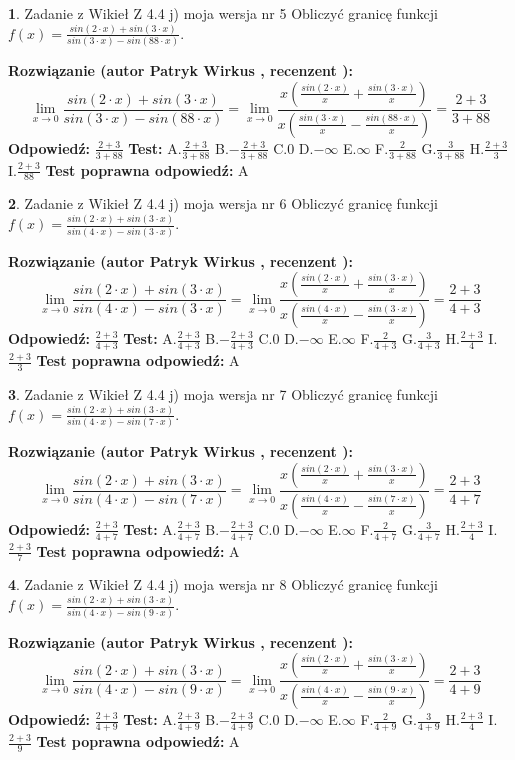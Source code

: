 \documentclass[12pt, a4paper]{article}
\theoremstyle{definition} %
\newtheorem{zad}{}
\newcommand{\zadStart}[1]{\begin{zad}#1\newline}
\newcommand{\zadStop}{\end{zad}}
\newcommand{\rozwStart}[2]{\noindent \textbf{Rozwiązanie (autor #1 , recenzent #2): }\newline}
\newcommand{\rozwStop}{\newline}
\newcommand{\odpStart}{\noindent \textbf{Odpowiedź:}\newline}
\newcommand{\odpStop}{\newline}
\newcommand{\testStart}{\noindent \textbf{Test:}\newline}
\newcommand{\testStop}{\newline}
\newcommand{\kluczStart}{\noindent \textbf{Test poprawna odpowiedź:}\newline}
\newcommand{\kluczStop}{\newline}
\begin{document}
\zadStart{Zadanie z Wikieł Z 4.4 j) moja wersja nr 5}
Obliczyć granicę funkcji $f(x)=\frac{sin(2\cdot x) +sin(3\cdot x)}{sin(3\cdot x) -sin(88\cdot x)}$.
\zadStop
\rozwStart{Patryk Wirkus}{}
$$\lim\limits_{x\to 0}\frac{sin(2\cdot x) +sin(3\cdot x)}{sin(3\cdot x) -sin(88\cdot x)}=\lim\limits_{x\to 0}\frac{x(\frac{sin(2\cdot x)}{x}+\frac{sin(3\cdot x)}{x})}{x(\frac{sin(3\cdot x)}{x}-\frac{sin(88\cdot x)}{x})}=\frac{2+3}{3+88}$$
\rozwStop
\odpStart
$\frac{2+3}{3+88}$
\odpStop
\testStart
A.$\frac{2+3}{3+88}$
B.$-\frac{2+3}{3+88}$
C.$0$
D.$-\infty$
E.$\infty$
F.$\frac{2}{3+88}$
G.$\frac{3}{3+88}$
H.$\frac{2+3}{3}$
I.$\frac{2+3}{88}$
\testStop
\kluczStart
A
\kluczStop



\zadStart{Zadanie z Wikieł Z 4.4 j) moja wersja nr 6}
Obliczyć granicę funkcji $f(x)=\frac{sin(2\cdot x) +sin(3\cdot x)}{sin(4\cdot x) -sin(3\cdot x)}$.
\zadStop
\rozwStart{Patryk Wirkus}{}
$$\lim\limits_{x\to 0}\frac{sin(2\cdot x) +sin(3\cdot x)}{sin(4\cdot x) -sin(3\cdot x)}=\lim\limits_{x\to 0}\frac{x(\frac{sin(2\cdot x)}{x}+\frac{sin(3\cdot x)}{x})}{x(\frac{sin(4\cdot x)}{x}-\frac{sin(3\cdot x)}{x})}=\frac{2+3}{4+3}$$
\rozwStop
\odpStart
$\frac{2+3}{4+3}$
\odpStop
\testStart
A.$\frac{2+3}{4+3}$
B.$-\frac{2+3}{4+3}$
C.$0$
D.$-\infty$
E.$\infty$
F.$\frac{2}{4+3}$
G.$\frac{3}{4+3}$
H.$\frac{2+3}{4}$
I.$\frac{2+3}{3}$
\testStop
\kluczStart
A
\kluczStop



\zadStart{Zadanie z Wikieł Z 4.4 j) moja wersja nr 7}
Obliczyć granicę funkcji $f(x)=\frac{sin(2\cdot x) +sin(3\cdot x)}{sin(4\cdot x) -sin(7\cdot x)}$.
\zadStop
\rozwStart{Patryk Wirkus}{}
$$\lim\limits_{x\to 0}\frac{sin(2\cdot x) +sin(3\cdot x)}{sin(4\cdot x) -sin(7\cdot x)}=\lim\limits_{x\to 0}\frac{x(\frac{sin(2\cdot x)}{x}+\frac{sin(3\cdot x)}{x})}{x(\frac{sin(4\cdot x)}{x}-\frac{sin(7\cdot x)}{x})}=\frac{2+3}{4+7}$$
\rozwStop
\odpStart
$\frac{2+3}{4+7}$
\odpStop
\testStart
A.$\frac{2+3}{4+7}$
B.$-\frac{2+3}{4+7}$
C.$0$
D.$-\infty$
E.$\infty$
F.$\frac{2}{4+7}$
G.$\frac{3}{4+7}$
H.$\frac{2+3}{4}$
I.$\frac{2+3}{7}$
\testStop
\kluczStart
A
\kluczStop



\zadStart{Zadanie z Wikieł Z 4.4 j) moja wersja nr 8}
Obliczyć granicę funkcji $f(x)=\frac{sin(2\cdot x) +sin(3\cdot x)}{sin(4\cdot x) -sin(9\cdot x)}$.
\zadStop
\rozwStart{Patryk Wirkus}{}
$$\lim\limits_{x\to 0}\frac{sin(2\cdot x) +sin(3\cdot x)}{sin(4\cdot x) -sin(9\cdot x)}=\lim\limits_{x\to 0}\frac{x(\frac{sin(2\cdot x)}{x}+\frac{sin(3\cdot x)}{x})}{x(\frac{sin(4\cdot x)}{x}-\frac{sin(9\cdot x)}{x})}=\frac{2+3}{4+9}$$
\rozwStop
\odpStart
$\frac{2+3}{4+9}$
\odpStop
\testStart
A.$\frac{2+3}{4+9}$
B.$-\frac{2+3}{4+9}$
C.$0$
D.$-\infty$
E.$\infty$
F.$\frac{2}{4+9}$
G.$\frac{3}{4+9}$
H.$\frac{2+3}{4}$
I.$\frac{2+3}{9}$
\testStop
\kluczStart
A
\kluczStop
\end{document}
